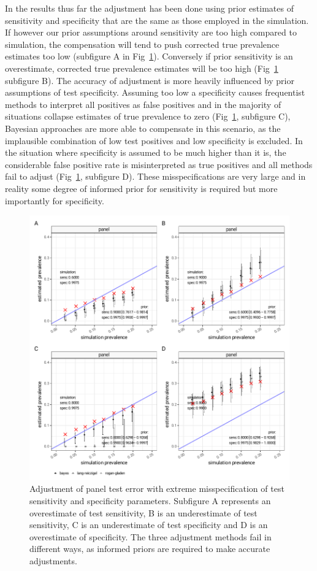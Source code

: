 \documentclass[a4paper, 12pt, twoside]{article}
\begin{document}
In the results thus far the adjustment has been done using prior estimates of sensitivity and specificity that are the same as those employed in the simulation. If however our prior assumptions around sensitivity are too high compared to simulation, the compensation will tend to push corrected true prevalence estimates too low (subfigure A in Fig~\ref{fig:B5}). Conversely if prior sensitivity is an overestimate, corrected true prevalence estimates will be too high (Fig~\ref{fig:B5} subfigure B). The accuracy of adjustment is more heavily influenced by prior assumptions of test specificity. Assuming too low a specificity causes frequentist methods to interpret all positives as false positives and in the majority of situations collapse estimates of true prevalence to zero (Fig~\ref{fig:B5}, subfigure C), Bayesian approaches are more able to compensate in this scenario, as the implausible combination of low test positives and low specificity is excluded. In the situation where specificity is assumed to be much higher than it is, the considerable false positive rate is misinterpreted as true positives and all methods fail to adjust (Fig~\ref{fig:B5}, subfigure D). These misspecifications are very large and in reality some degree of informed prior for sensitivity is required but more importantly for specificity.

\begin{figure}[h!]
\centering
  \includegraphics{fig/bayesian-sim-mismatch}
  \caption{Adjustment of panel test error with extreme misspecification of test sensitivity and specificity parameters. Subfigure A represents an overestimate of test sensitivity, B is an underestimate of test sensitivity, C is an underestimate of test specificity and D is an overestimate of specificity. The three adjustment methods fail in different ways, as informed priors are required to make accurate adjustments.}
\label{fig:B5}
\end{figure}
\end{document}
